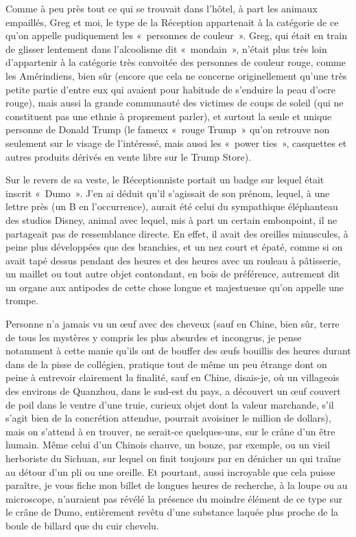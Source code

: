 Comme à peu près tout ce qui se trouvait dans l’hôtel, à part les animaux empaillés, Greg et moi, le type de la Réception appartenait à la catégorie de ce qu’on appelle pudiquement les «~personnes de couleur~». Greg, qui était en train de glisser lentement dans l’alcoolisme dit «~mondain~», n’était plus très loin d’appartenir à la catégorie très convoitée des personnes de couleur rouge, comme les Amérindiens, bien sûr (encore que cela ne concerne originellement qu’une très petite partie d’entre eux qui avaient pour habitude de s’enduire la peau d’ocre rouge), mais aussi la grande communauté des victimes de coups de soleil (qui ne constituent pas une ethnie à proprement parler), et surtout la seule et unique personne de Donald Trump (le fameux «~rouge Trump~» qu’on retrouve non seulement sur le visage de l’intéressé, mais aussi les «~power ties~», casquettes et autres produits dérivés en vente libre sur le Trump Store).

Sur le revers de sa veste, le Réceptionniste portait un badge sur lequel était inscrit «~Dumo~». J’en ai déduit qu’il s’agissait de son prénom, lequel, à une lettre près (un B en l’occurrence), aurait été celui du sympathique éléphanteau des studios Disney, animal avec lequel, mis à part un certain embonpoint, il ne partageait pas de ressemblance directe. En effet, il avait des oreilles minuscules, à peine plus développées que des branchies, et un nez court et épaté, comme si on avait tapé dessus pendant des heures et des heures avec un rouleau à pâtisserie, un maillet ou tout autre objet contondant, en bois de préférence, autrement dit un organe aux antipodes de cette chose longue et majestueuse qu’on appelle une trompe.

\label{rat:44}%
Personne n’a jamais vu un œuf avec des cheveux (sauf en Chine, bien sûr, terre de tous les mystères y compris les plus absurdes et incongrus, je pense notamment à cette manie qu’ils ont de bouffer des œufs bouillis des heures durant dans de la pisse de collégien, pratique tout de même un peu étrange dont on peine à entrevoir clairement la finalité, sauf en Chine, disais-je, où un villageois des environs de Quanzhou, dans le sud-est du pays, a découvert un œuf couvert de poil dans le ventre d’une truie, curieux objet dont la valeur marchande, s’il s’agit bien de la concrétion attendue, pourrait avoisiner le million de dollars), mais on s’attend à en trouver, ne serait-ce quelques-uns, sur le crâne d’un être humain. Même celui d’un Chinois chauve, un bonze, par exemple, ou un vieil herboriste du Sichuan, sur lequel on finit toujours par en dénicher un qui traîne au détour d’un pli ou une oreille. Et pourtant, aussi incroyable que cela puisse paraître, je vous fiche mon billet de longues heures de recherche, à la loupe ou au microscope, n’auraient pas révélé la présence du moindre élément de ce type sur le crâne de Dumo, entièrement revêtu d’une substance laquée plus proche de la boule de billard que du cuir chevelu.

